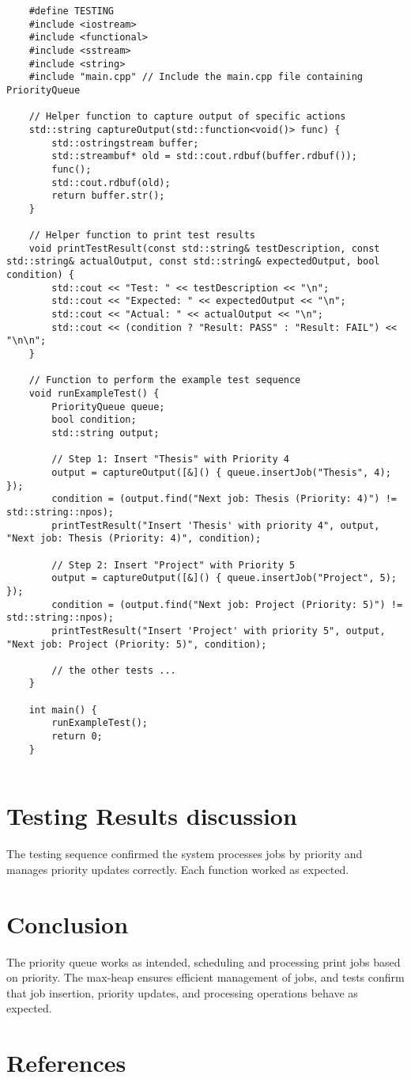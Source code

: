 \documentclass{article}
\begin{document}
\begin{lstlisting}
    #define TESTING
    #include <iostream>
    #include <functional>
    #include <sstream>
    #include <string>
    #include "main.cpp" // Include the main.cpp file containing PriorityQueue
    
    // Helper function to capture output of specific actions
    std::string captureOutput(std::function<void()> func) {
        std::ostringstream buffer;
        std::streambuf* old = std::cout.rdbuf(buffer.rdbuf());
        func();
        std::cout.rdbuf(old);
        return buffer.str();
    }
    
    // Helper function to print test results
    void printTestResult(const std::string& testDescription, const std::string& actualOutput, const std::string& expectedOutput, bool condition) {
        std::cout << "Test: " << testDescription << "\n";
        std::cout << "Expected: " << expectedOutput << "\n";
        std::cout << "Actual: " << actualOutput << "\n";
        std::cout << (condition ? "Result: PASS" : "Result: FAIL") << "\n\n";
    }
    
    // Function to perform the example test sequence
    void runExampleTest() {
        PriorityQueue queue;
        bool condition;
        std::string output;
    
        // Step 1: Insert "Thesis" with Priority 4
        output = captureOutput([&]() { queue.insertJob("Thesis", 4); });
        condition = (output.find("Next job: Thesis (Priority: 4)") != std::string::npos);
        printTestResult("Insert 'Thesis' with priority 4", output, "Next job: Thesis (Priority: 4)", condition);
    
        // Step 2: Insert "Project" with Priority 5
        output = captureOutput([&]() { queue.insertJob("Project", 5); });
        condition = (output.find("Next job: Project (Priority: 5)") != std::string::npos);
        printTestResult("Insert 'Project' with priority 5", output, "Next job: Project (Priority: 5)", condition);
    
        // the other tests ...
    }
    
    int main() {
        runExampleTest();
        return 0;
    }
    
\end{lstlisting}

\section*{Testing Results discussion}
The testing sequence confirmed the system processes jobs by priority and manages priority updates correctly. Each function worked as expected.


\section*{Conclusion}

The priority queue works as intended, scheduling and processing print jobs based on priority. The max-heap ensures efficient management of jobs, and tests confirm that job insertion, priority updates, and processing operations behave as expected.

\section*{References}
\end{document}
